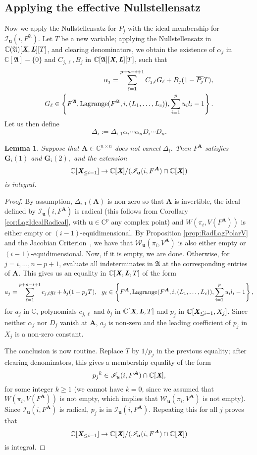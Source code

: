 \documentclass[a4paper]{article}
\def\A{\mathfrak{A}}
\def\Lb{\textit{\textbf{L}}}
\def\Xb{\textit{\textbf{X}}}
\def\mA{{\bm A}}
\def\ub{{\bm u}}
\def\pjb{\overline{P_{j}}}
\def\D{\Delta}
\DeclareMathOperator{\lag}{Lagrange}
\def\C{\mathbb{C}}
\def\WiA{W(\pi_i,V(F^{\mA}))}
\def\lagFA{{\bm\lag}(F^{\mA},i,(L_1,\hdots,L_c))}
\def\lagFfA{{\bm\lag}(F^{\A},i,(L_1,\hdots,L_c))}
\def\IilA{\mathscr{I}_{\ub}(i,F^{\mA})}
\def\IilfA{\mathscr{I}_{\ub}(i,F^{\A})}
\def\WilA{\mathscr{W}_{\ub}(\pi_i,V^{\mA})}
\def\udl{\sum_{i=1}^pu_il_i}
\newtheorem{lemma}[theorem]{Lemma}
\begin{document}
\subsection{Applying the effective Nullstellensatz}
Now we apply the Nullstellensatz for $\pjb$ with the ideal membership for $\IilfA.$ Let $T$ be a new variable; applying the
Nullstellensatz in $\C(\A)[\Xb,\Lb][T]$, and clearing
denominators, we obtain the existence of $\alpha_j$ in
$\C[\A]-\{0\}$ and $ C_{j,\ell},B_j$ in
$\C[\A][\Xb,\Lb][T]$, such that
\begin{align*}
\alpha_j = \sum_{\ell=1}^{p+n-i+1} C_{j,\ell} G_\ell + B_j (1-\pjb T),\\  G_\ell \in 
\left\{ 
F^\A,\lagFfA, \udl-1
\right\}.
\end{align*}
Let us then define 
$$\D_{i}:=\D_{i,1} \alpha_i \cdots \alpha_n D_i \cdots D_n.$$

\begin{lemma}\label{lem:6.4}
Suppose that $\mA \in \C^{n\times n}$ does not cancel $\D_{i}$. Then $F^{\mA}$ satisfies $\bm G_i(1)$ and $\bm G_i(2),$ and the extension
\[
 \C[\Xb_{\leq i-1}]\rightarrow \C[\Xb]/(\IilA \cap \C[\Xb])
\]
is integral.
\end{lemma}

\begin{proof}
By assumption, $\D_{i,1}(\mA)$ is non-zero so that $\mA$ is
invertible, the
ideal defined by $\IilA$ is radical (this follows from Corollary \ref{cor:LagIdealRadical}, with $\ub \in \C^p$ any complex point) and 
$\WiA$ is either empty or $(i-1)$-equidimensional. By Proposition \ref{prop:RadLagPolarV} and the Jacobian Criterion~\cite[Corollary 16.20]{ECA}, we have that $\WilA$ is also either empty or $(i-1)$-equidimensional. Now, if
it is empty, we are done. Otherwise, for $j=i,\dots,n-p+1$, evaluate all indeterminates in $\A$ at the
corresponding entries of $\mA$. This gives us
an equality in $\C[\Xb,\Lb,T]$ of the form
\begin{align*}
a_j = \sum_{\ell=1}^{p+n-i+1} c_{j,\ell} g_\ell + b_j (1-p_j T),\ \  g_\ell \in 
\left\{ 
F^{\mA}, \lagFA, \udl-1
\right\},
\end{align*}
for $a_j$ in $\C$, polynomials $c_{j,\ell}$ and $b_j$ in
$\C[\Xb,\Lb,T]$ and $p_j$ in
$\C[\Xb_{\leq i-1},X_j]$. Since neither $\alpha_j$ nor $D_j$
vanish at $\mA$, $a_j$ is non-zero and the leading coefficient of
$p_j$ in $X_j$ is a non-zero constant.

The conclusion is now routine. Replace $T$ by $1/p_j$ in the
previous equality; after clearing denominators, this gives a
membership equality of the form 
\[
p_j{}^k \in \IilA \cap \C[\Xb],
\]
for some integer $k \ge 1$ (we cannot have $k=0$, since we assumed that $\WiA$ is not empty, which implies that $\WilA$ is not empty). Since $\IilA$ is radical,
$p_j$ is in $\IilA$. Repeating this for all $j$ proves that 
\[
\C[\Xb_{\leq i-1}]\rightarrow\C[\Xb]/(\IilA \cap \C[\Xb])
\]
is integral.
\end{proof}
\end{document}
